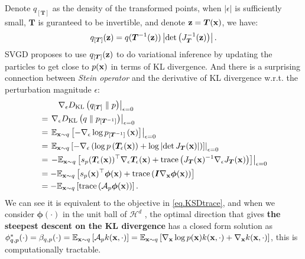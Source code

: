 \documentclass{article}
\begin{document}
Denote $q_{\left[ \bm T \right]}$ as the density of the transformed points, when $\left| \epsilon \right|$ is sufficiently small, $\bm T$ is guranteed to be invertible, and denote ${\mathbf{z}} = \bm T({\mathbf{x}})$, we have:
\begin{equation}
    q_{\left[\bm T\right]}({\mathbf{z}}) = q(\bm T^{-1}({\mathbf{z}}))\left| \det \left( J_{\bm T}^{-1} ({\mathbf{z}}) \right) \right|.
\end{equation}
SVGD proposes to use $q_{\left[ \bm T \right]}({\mathbf{z}})$ to do variational inference by updating the particles to get close to $p({\mathbf{x}})$ in terms of KL divergence. And there is a surprising connection between \textit{Stein operator} and the derivative of KL divergence w.r.t. the perturbation magnitude $\epsilon$:
\begin{align}
    &\qquad \left.\nabla_\epsilon D_{\mathrm{KL}}\left( q_{\left[ \bm T \right]} \parallel p \right)\right|_{\epsilon = 0} \\
    &= \left.\nabla_\epsilon D_{\mathrm{KL}}\left( q \parallel p_{\left[ \bm T^{-1} \right]} \right)\right|_{\epsilon = 0} \\
    &= \left. \mathbb{E}_{{\mathbf{x}}\sim q} \left[ -\nabla_\epsilon \log p_{\left[ \bm T^{-1} \right]}\left({\mathbf{x}}\right) \right] \right|_{\epsilon = 0} \\
    &= \left. \mathbb{E}_{{\mathbf{x}}\sim q} \left[ -\nabla_\epsilon \left( \log p\left( \bm T_\epsilon ({\mathbf{x}}) \right) + \log \left| \det J_{\bm T}({\mathbf{x}}) \right| \right) \right] \right|_{\epsilon = 0} \\
    &= \left. -\mathbb{E}_{{\mathbf{x}}\sim q} \left[ s_p(\bm T_\epsilon({\mathbf{x}}))^\top \nabla_\epsilon \bm T_\epsilon({\mathbf{x}}) + \mathrm{trace}\left( J_{\bm T}({\mathbf{x}})^{-1} \nabla_\epsilon J_{\bm T}({\mathbf{x}}) \right) \right] \right|_{\epsilon = 0}\\
    &= -\mathbb{E}_{{\mathbf{x}}\sim q} \left[ s_p({\mathbf{x}})^\top \bm\phi({\mathbf{x}}) + \mathrm{trace}\left( \bm I \nabla_{\mathbf{x}} \bm \phi({\mathbf{x}}) \right) \right] \\
    &= -\mathbb{E}_{{\mathbf{x}} \sim q} \left[ \mathrm{trace}\left( \mathcal{A}_p \bm \phi({\mathbf{x}}) \right) \right].
\end{align}
We can see it is equivalent to the objective in \eqref{eq.KSDtrace}, and when we consider $\bm \phi(\cdot)$ in the unit ball of $\mathcal{H}^d$ , the optimal direction that gives \textbf{the steepest descent on the KL divergence} has a closed form solution as $\phi^*_{q, p}(\cdot) = \beta_{q, p}(\cdot) = \mathbb{E}_{{\mathbf{x}} \sim q} \left[ \mathcal{A}_p k({\mathbf{x}}, \cdot) \right] = \mathbb{E}_{{\mathbf{x}} \sim q} \left[ \nabla_{\mathbf{x}} \log p({\mathbf{x}}) k({\mathbf{x}}, \cdot) + \nabla_{\mathbf{x}} k({\mathbf{x}}, \cdot) \right] $, this is computationally tractable.
\end{document}
